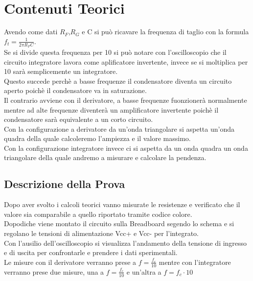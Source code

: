 \documentclass[12pt]{article}
\begin{document}
\section{Contenuti Teorici}
Avendo come dati $R_F$,$R_G$ e C si può ricavare la frequenza di taglio con la formula $f_t=\frac{1}{2 \pi R_F C}$.\\
Se si divide questa frequenza per 10 si può notare con l’oscilloscopio che il circuito integratore lavora come aplificatore invertente, invece se si moltiplica per 10 sarà semplicemente un integratore.\\
Questo succede perchè a basse frequenze il condensatore diventa un circuito aperto poichè il condensatore va in 
saturazione.\\
Il contrario avviene con il derivatore, a basse frequenze fuonzionerà normalmente mentre ad alte frequenze
diventerà un amplificatore invertente poichè il condensatore sarà equivalente a un corto circuito.\\
Con la configurazione a derivatore da un'onda triangolare si aspetta un'onda quadra della quale calcoleremo l'ampiezza e il valore massimo.\\
Con la configurazione integratore invece ci si aspetta da un onda quadra un onda triangolare della quale andremo a misurare e calcolare la pendenza.\\
\subsection{Descrizione della Prova}
Dopo aver svolto i calcoli teorici vanno misurate le resistenze e verificato che il valore sia comparabile
a quello riportato tramite codice colore.\\
Dopodiche viene montato il circuito sulla Breadboard segendo lo schema e si regolano le tensioni di 
alimentazione Vcc+ e Vcc- per l’integrato.\\
Con l’ausilio dell’oscilloscopio si visualizza l’andamento della tensione di ingresso e di uscita per 
confrontarle e prendere i dati sperimentali.\\
Le misure con il derivatore verranno prese a $f=\frac{f_c}{10}$ mentre con l'integratore verranno prese due misure, una a $f=\frac{f_c}{10}$ e un'altra a $f=f_c \cdot 10$
\end{document}
